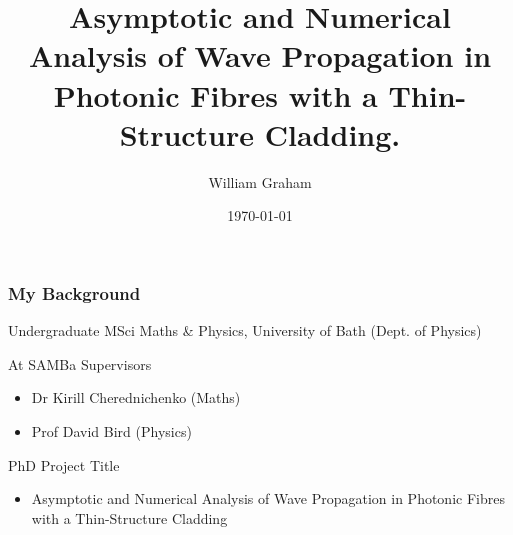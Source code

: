 \documentclass{beamer}
\title{Asymptotic and Numerical Analysis of Wave Propagation in Photonic Fibres with a Thin-Structure Cladding.}
\author{William Graham}
\institute{University of Bath}
\date{\today}
\begin{document}
 
\frame{\titlepage}
 
\begin{frame}
	\frametitle{My Background}

	\begin{block}{Undergraduate}
		MSci Maths \& Physics, University of Bath (Dept. of Physics)
	\end{block}
	
	\begin{block}{At SAMBa}
	Supervisors
		\begin{itemize}
			\item Dr Kirill Cherednichenko (Maths)
			\item Prof David Bird (Physics)
		\end{itemize}
	PhD Project Title
		\begin{itemize}
			\item Asymptotic and Numerical Analysis of Wave Propagation in Photonic Fibres with a Thin-Structure Cladding
		\end{itemize}
	\end{block}

\end{frame} 
\end{document}
